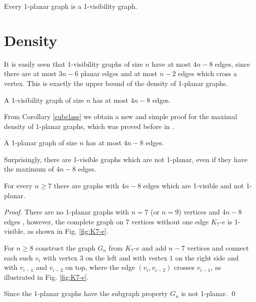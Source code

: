 \documentclass[runningheads]{llncs}
\begin{document}
\begin{corollary} \label{subclass}
Every 1-planar graph is a  1-visibility graph.
\end{corollary}

\section{Density}

It is easily seen that 1-visibility graphs of size $n$ have at most
$4n-8$ edges, since there are at most $3n-6$ planar edges and at
most $n-2$ edges which cross a vertex. This is exactly the upper
bound of the density of 1-planar graphs.



\begin{corollary}
A 1-visibility graph of size $n$ has at most $4n-8$ edges.
\end{corollary}

From Corollary \ref{subclass} we obtain a new and simple proof for
the maximal density of 1-planar graphs, which was proved before in
\cite{bhw-bs-83,pt-gdfce-97,fm-s1pg-07}.

\begin{corollary}
A 1-planar graph  of size $n$ has at most $4n-8$ edges.
\end{corollary}


Surprisingly, there are 1-visible graphs which are not 1-planar,
even if they have the maximum of $4n-8$ edges.

\begin{theorem}
For every $n \geq 7$ there are graphs with $4n-8$ edges which are
1-visible and not 1-planar.
\end{theorem}

\begin{proof}
There are no 1-planar graphs with $n=7$ (or $n=9$) vertices and
$4n-8$ edges \cite{bhw-1og-84,s-rm1pg-10}, however, the complete
graph on $7$ vertices without one edge $K_7$-$e$ is 1-visible, as
shown in Fig. \ref{fig:K7-e}.

For $n \geq 8$ construct the graph  $G_n$ from $K_7$-$e$ and add
$n-7$ vertices and connect each such $v_i$ with vertex $3$ on the
left and with vertex $1$ on the right side and with $v_{i-1}$ and
$v_{i-2}$ on top, where the edge $(v_i, v_{i-2})$ crosses $v_{i-1}$,
as illustrated in Fig. \ref{fig:K7-e}.

Since the 1-planar graphs have the subgraph property  $G_n$ is not
1-planar.
 \qed
\end{proof}
\end{document}
